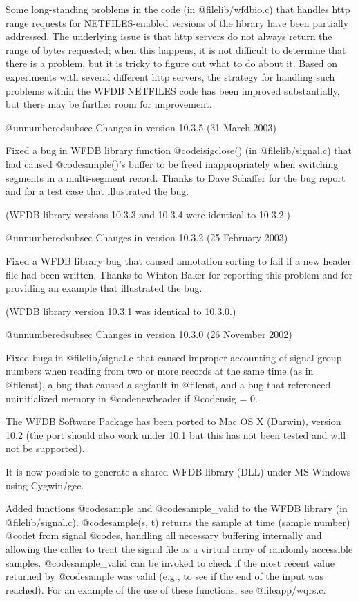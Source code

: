 {{{{{{{{Some long-standing problems in the code (in @file{lib/wfdbio.c}) that handles
http range requests for NETFILES-enabled versions of the library have
been partially addressed.  The underlying issue is that http servers
do not always return the range of bytes requested;  when this happens,
it is not difficult to determine that there is a problem, but it is
tricky to figure out what to do about it.  Based on experiments with
several different http servers, the strategy for handling such problems
within the WFDB NETFILES code has been improved substantially, but
there may be further room for improvement.

@unnumberedsubsec Changes in version 10.3.5 (31 March 2003)

Fixed a bug in WFDB library function @code{isigclose()} (in
@file{lib/signal.c}) that had caused @code{sample()}'s buffer to be freed
inappropriately when switching segments in a multi-segment record.
Thanks to Dave Schaffer for the bug report and for a test case that
illustrated the bug.

(WFDB library versions 10.3.3 and 10.3.4 were identical to 10.3.2.)

@unnumberedsubsec Changes in version 10.3.2 (25 February 2003)

Fixed a WFDB library bug that caused annotation sorting to fail
if a new header file had been written.  Thanks to Winton Baker for
reporting this problem and for providing an example that illustrated
the bug.

(WFDB library version 10.3.1 was identical to 10.3.0.)

@unnumberedsubsec Changes in version 10.3.0 (26 November 2002)

Fixed bugs in @file{lib/signal.c} that caused improper accounting of signal
group numbers when reading from two or more records at the same time (as in
@file{nst}), a bug that caused a segfault in @file{nst}, and a bug that
referenced uninitialized memory in @code{newheader} if @code{nsig} = 0.

The WFDB Software Package has been ported to Mac OS X (Darwin),
version 10.2 (the port should also work under 10.1 but this
has not been tested and will not be supported).	

It is now possible to generate a shared WFDB library (DLL)
under MS-Windows using Cygwin/gcc.

Added functions @code{sample} and @code{sample_valid} to the WFDB library
(in @file{lib/signal.c}).  @code{sample(s, t)} returns the sample at
time (sample number) @code{t} from signal @code{s}, handling all
necessary buffering internally and allowing the caller to treat the
signal file as a virtual array of randomly accessible samples.
@code{sample_valid} can be invoked to check if the most recent value
returned by @code{sample} was valid (e.g., to see if the end of the
input was reached).  For an example of the use of these functions, see
@file{app/wqrs.c}.

}}}}}}}}
